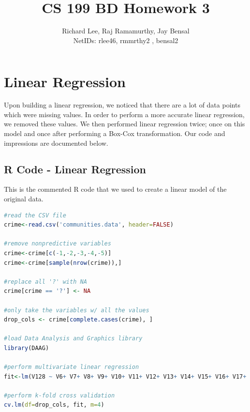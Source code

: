 \documentclass{article}
\begin{document}
\title{CS 199 BD Homework 3}
\author{Richard Lee, Raj Ramamurthy, Jay Bensal\\
  NetIDs: rlee46, rmmrthy2 , bensal2}

\maketitle

\section{Linear Regression}
Upon building a linear regression, we noticed that
there are a lot of data points which were missing values. In order to perform a more accurate 
linear regression, we removed these values. We then performed linear regression twice; once on this model and once after performing a  Box-Cox transformation. Our code and impressions are documented below.

\subsection{R Code - Linear Regression}
This is the commented R code that we used to create a linear model of the original data.

\begin{lstlisting}[language=r]
#read the CSV file
crime<-read.csv('communities.data', header=FALSE)

#remove nonpredictive variables
crime<-crime[c(-1,-2,-3,-4,-5)]
crime<-crime[sample(nrow(crime)),]

#replace all '?' with NA
crime[crime == '?'] <- NA

#only take the variables w/ all the values
drop_cols <- crime[complete.cases(crime), ]

#load Data Analysis and Graphics library
library(DAAG)

#perform multivariate linear regression
fit<-lm(V128 ~ V6+ V7+ V8+ V9+ V10+ V11+ V12+ V13+ V14+ V15+ V16+ V17+ V18+ V19+ V20+ V21+ V22+ V23+ V24+ V25+ V26+ V27+ V28+ V29+ V30+ V32+ V33+ V34+ V35+ V36+ V37+ V38+ V39+ V40+ V41+ V42+ V43+ V44+ V45+ V46+ V47+ V48+ V49+ V50+ V51+ V52+ V53+ V54+ V55+ V56+ V57+ V58+ V59+ V60+ V61+ V62+ V63+ V64+ V65+ V66+ V67+ V68+ V69+ V70+ V71+ V72+ V73+ V74+ V75+ V76+ V77+ V78+ V79+ V80+ V81+ V82+ V83+ V84+ V85+ V86+ V87+ V88+ V89+ V90+ V91+ V92+ V93+ V94+ V95+ V96+ V97+ V98+ V99+ V100+ V101+ V119+ V120+ V121+ V126, data=drop_cols)

#perform k-fold cross validation
cv.lm(df=drop_cols, fit, m=4)
\end{lstlisting}
\end{document}
